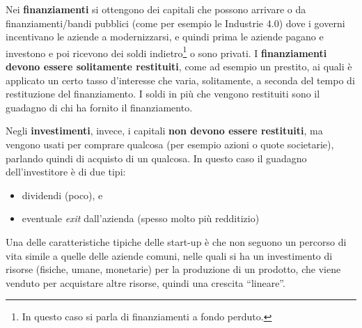 Nei \textbf{finanziamenti} si ottengono dei capitali che possono arrivare o da
finanziamenti/bandi pubblici (come per esempio le Industrie 4.0) dove i governi
incentivano le aziende a modernizzarsi, e quindi prima le aziende pagano e
investono e poi ricevono dei soldi indietro\footnote{In questo caso si parla
di finanziamenti a fondo perduto.} o sono privati. I \textbf{finanziamenti
devono essere solitamente restituiti}, come ad esempio un prestito, ai quali è
applicato un certo tasso d'interesse che varia, solitamente, a seconda del
tempo di restituzione del finanziamento. I soldi in più che vengono restituiti
sono il guadagno di chi ha fornito il finanziamento.

Negli \textbf{investimenti}, invece, i capitali \textbf{non devono essere
restituiti}, ma vengono usati per comprare qualcosa (per esempio azioni o quote
societarie), parlando quindi di acquisto di un qualcosa. In questo caso il
guadagno dell'investitore è di due tipi:
\begin{itemize}
	\item dividendi (poco), e
	\item eventuale \textit{exit} dall'azienda (spesso molto più redditizio)
\end{itemize}

\noindent Una delle caratteristiche tipiche delle start-up è che non seguono un
percorso di vita simile a quelle delle aziende comuni, nelle quali si ha un
investimento di risorse (fisiche, umane, monetarie) per la produzione di un
prodotto, che viene venduto per acquistare altre risorse, quindi una crescita
``lineare''.

